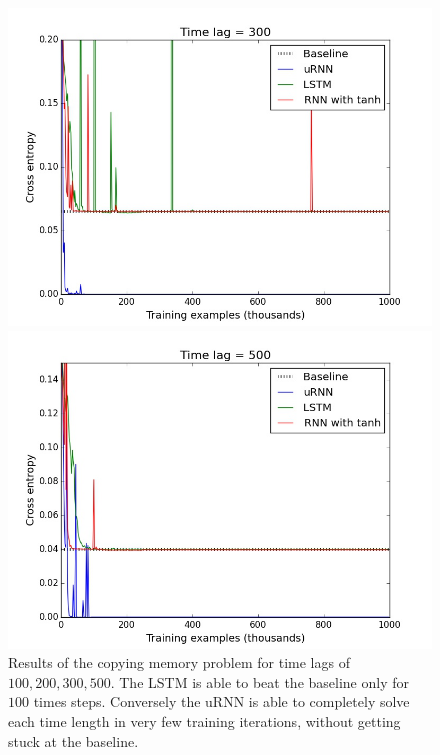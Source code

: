 \documentclass{article} %
\begin{document}
\begin{figure}[t!]
\begin{minipage}[b]{0.5\linewidth}
    \includegraphics[scale=0.25]{figures/memory_300.jpeg}
  \end{minipage}%
  \begin{minipage}[b]{0.5\linewidth}
    \includegraphics[scale=0.25]{figures/memory_500.jpeg}
  \end{minipage} 
  \caption{Results of the copying memory problem for time lags of $100, 200, 300, 500$. 
   The LSTM is able to beat the baseline only for $100$ times steps. Conversely the uRNN 
    is able to completely solve each time length in very few training iterations,
    without getting stuck at the baseline.}
  \label{fig1} 
\end{figure}
\end{document}
